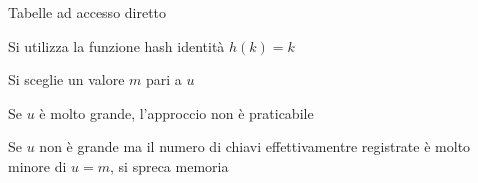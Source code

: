 \begin{frame}{Tabelle ad accesso diretto}

\vspace{-9pt}

\begin{myboxtitle}
\BI
\item Si utilizza la \alert{funzione hash identità} $h(k)=k$
\item Si sceglie un valore $m$ pari a $u$
\EI
\end{myboxtitle}

\begin{myboxtitle}[Problemi]
\BI
\item Se $u$ è molto grande, l'approccio non è  praticabile 
\item Se $u$ non è grande ma il numero di chiavi 
effettivamentre registrate è molto minore di $u=m$, si spreca memoria
\EI
\end{myboxtitle}

\end{frame}

